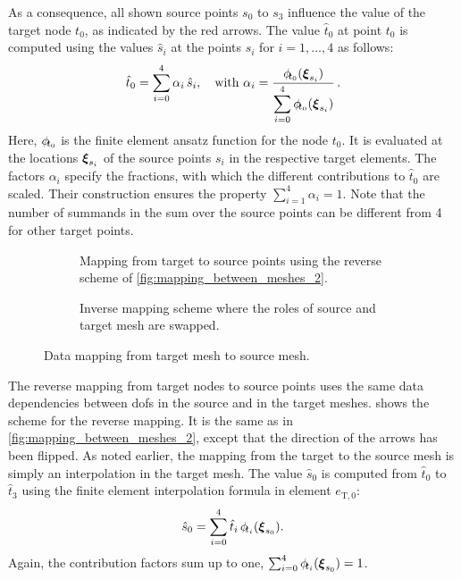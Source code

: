 As a consequence, all shown source points $s_0$ to $s_3$ influence the value of the target node $t_0$, as indicated by the red arrows.
The value $\hat{t}_0$ at point $t_0$ is computed using the values $\hat{s}_i$ at the points $s_i$ for $i=1,\dots,4$ as follows:
%
\begin{align}\label{eq:mapping_source_target}
  \hat{t}_0 = \s{i=0}{4} \alpha_i\,\hat{s}_i, \quad \text{with }\alpha_i = \dfrac{\phi_{\noexpand\mkern-4mu t_0}(\bfxi_{s_i})}{\s{i=0}{4} \phi_{\noexpand\mkern-4mu t_0}(\bfxi_{s_i})}.
\end{align}
Here, $\phi_{\noexpand\mkern-4mu t_0}$ is the finite element ansatz function for the node $t_0$. It is evaluated at the locations $\boldsymbol{\xi}_{s_i}$ of the source points $s_i$ in the respective target elements. The factors $\alpha_i$ specify the fractions, with which the different contributions to $\hat{t}_0$ are scaled. Their construction ensures the property $\sum_{i=1}^4 \alpha_i = 1$.
Note that the number of summands in the sum over the source points can be different from 4 for other target points.

\begin{figure}%
  \centering%
  \begin{subfigure}{0.4\textwidth}
    \centering
    \def\svgwidth{\textwidth}
    \caption{Mapping from target to source points using the reverse scheme of \cref{fig:mapping_between_meshes_2}.}%
    \label{fig:mapping_between_meshes_3}%
  \end{subfigure}
  \quad
  \begin{subfigure}{0.4\textwidth}
    \centering
    \def\svgwidth{\textwidth}
    \caption{Inverse mapping scheme where the roles of source and target mesh are swapped.}%
    \label{fig:mapping_between_meshes_4}%
  \end{subfigure}
  \caption{Data mapping from target mesh to source mesh.}%
  \label{fig:mapping_between_meshes_34}%
\end{figure}%

The reverse mapping from target nodes to source points uses the same data dependencies between dofs in the source and in the target meshes.  shows the scheme for the reverse mapping. It is the same as in \cref{fig:mapping_between_meshes_2}, except that the direction of the arrows has been flipped. As noted earlier, the mapping from the target to the source mesh is simply an interpolation in the target mesh. The value $\hat{s}_0$ is computed from $\hat{t}_0$ to $\hat{t}_3$ using the finite element interpolation formula in element $e_{\text{T},0}$:%
\begin{align*}
  \hat{s}_0 = \s{i=0}{4}\hat{t}_i\,\phi_{\noexpand\mkern-4mu t_i}(\bfxi_{s_0}).
\end{align*}
Again, the contribution factors sum up to one, $\sum_{i=0}^4 \phi_{\noexpand\mkern-4mu t_i}(\bfxi_{s_0}) = 1$.


